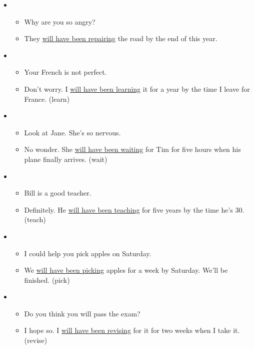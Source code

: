 \begin{itemize}

\item
\begin{itemize}
\item Why are you so angry?
\item They \underline{will have been repairing} the road by the end of this year. 
\end{itemize}

\item
\begin{itemize}
\item Your French is not perfect. 
\item Don't worry. I \underline{will have been learning} it for a year by the time I leave for France. (learn)
\end{itemize}

\item
\begin{itemize}
\item Look at Jane. She's so nervous. 
\item No wonder. She \underline{will have been waiting} for Tim for five hours when his plane finally arrives. (wait)
\end{itemize}

\item
\begin{itemize}
\item Bill is a good teacher.
\item Definitely. He \underline{will have been teaching} for five years by the time he's 30. (teach) 
\end{itemize}

\item
\begin{itemize}
\item I could help you pick apples on Saturday.
\item We \underline{will have been picking} apples for a week by Saturday. We'll be finished. (pick) 
\end{itemize}

\item
\begin{itemize}
\item Do you think you will pass the exam? 
\item I hope so. I \underline{will have been revising} for it for two weeks when I take it. (revise)
\end{itemize}


\end{itemize}
